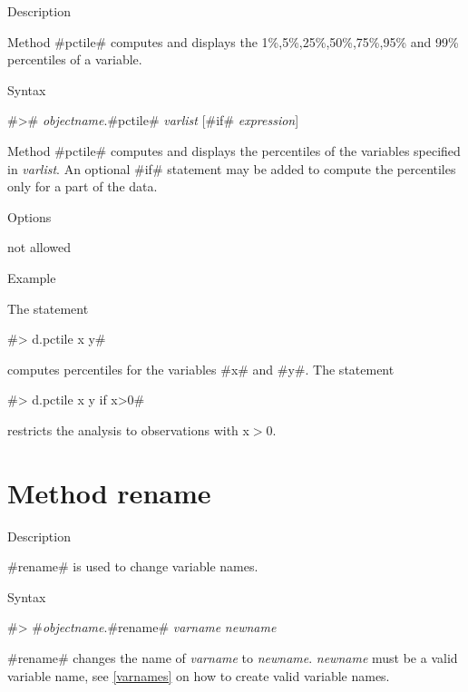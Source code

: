 \begin{stanza}{Description}

{Method #pctile# computes and displays the
1\%,5\%,25\%,50\%,75\%,95\% and 99\%  percentiles of a variable.}
\end{stanza}

\begin{stanza}{Syntax}

{#># {\em objectname}.#pctile# {\em varlist} [#if# {\em expression}]

Method #pctile# computes and displays the percentiles of the
variables specified in {\em varlist}. An optional #if# statement
may be added to compute the percentiles only for a part of the
data.}
\end{stanza}

\begin{stanza}{Options}

{not allowed}
\end{stanza}


\begin{stanza}{Example}

{The statement

#> d.pctile x y#

computes percentiles for the variables #x# and #y#.
The statement

#> d.pctile x y if x>0#

restricts the analysis to observations with x$>$0.}
\end{stanza}



\clearpage



\section{Method rename}
 


\label{rename}


\begin{stanza}{Description}

{#rename# is used to change variable names.}
\end{stanza}


\begin{stanza}{Syntax}

{#> #{\em objectname}.#rename# {\em varname} {\em newname}

#rename# changes the name of {\em varname} to {\em newname}. {\em
newname} must be a valid variable name, see \autoref{varnames} on
how to create valid variable names.}
\end{stanza}

